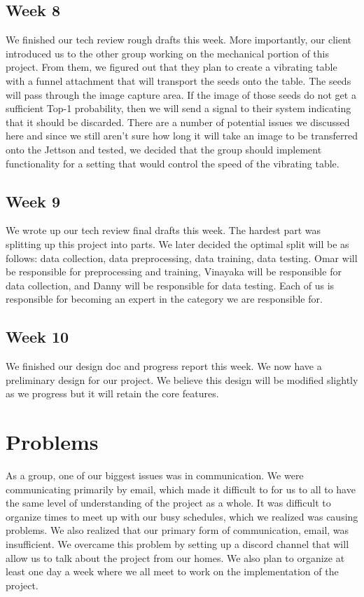 \documentclass[onecolumn, draftclsnofoot,10pt, compsoc]{IEEEtran}
\begin{document}
	\subsection{Week 8}
	We finished our tech review rough drafts this week. More importantly, our client introduced us to the other group working on the mechanical portion of this project. From them, we figured out that they plan to create a vibrating table with a funnel attachment that will transport the seeds onto the table. The seeds will pass through the image capture area. If the image of those seeds do not get a sufficient Top-1 probability, then we will send a signal to their system indicating that it should be discarded. There are a number of potential issues we discussed here and since we still aren't sure how long it will take an image to be transferred onto the Jettson and tested, we decided that the group should implement functionality for a setting that would control the speed of the vibrating table. 
	\subsection{Week 9}
	We wrote up our tech review final drafts this week. The hardest part was splitting up this project into parts. We later decided the optimal split will be as follows: data collection, data preprocessing, data training, data testing. Omar will be responsible for preprocessing and training, Vinayaka will be responsible for data collection, and Danny will be responsible for data testing. Each of us is responsible for becoming an expert in the category we are responsible for. 
	\subsection{Week 10}
	We finished our design doc and progress report this week. We now have a preliminary design for our project. We believe this design will be modified slightly as we progress but it will retain the core features.
	
	\section{Problems}
	
	As a group, one of our biggest issues was in communication. We were communicating primarily by email, which made it difficult to for us to all to have the same level of understanding of the project as a whole. It was difficult to organize times to meet up with our busy schedules, which we realized was causing problems. We also realized that our primary form of communication, email, was insufficient. We overcame this problem by setting up a discord channel that will allow us to talk about the project from our homes. We also plan to organize at least one day a week where we all meet to work on the implementation of the project.
	
\end{document}
